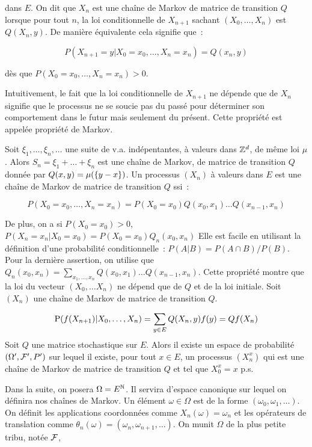 dans $E$. On dit que $X_n$ est une chaîne de Markov de matrice de transition $Q$ lorsque pour tout $n$, 
la loi conditionnelle de $X_{n+1}$ sachant $(X_0,\ldots,X_n)$ est $Q(X_n,y)$. De manière équivalente
cela signifie que~:\par
$$P(X_{n+1}=y|X_0=x_0,\ldots,X_n=x_n) = Q(x_n,y)$$\par
dès que $P(X_0=x_0,\ldots,X_n=x_n)>0$.\par
Intuitivement, le fait que la loi conditionnelle de $X_{n+1}$ ne dépende que de $X_n$ signifie que le 
processus ne se soucie pas du passé pour déterminer son comportement dans le futur mais seulement du présent.
Cette propriété est appelée propriété de Markov.\par
\rmq Soit $\xi_1,\ldots,\xi_n,\ldots$ une suite de v.a. indépentantes, à valeurs dans ${\mathbb{Z}}^d$, de même loi 
$\mu$. Alors $S_n = \xi_1 + \ldots + \xi_n$ est une chaîne de Markov, de matrice de transition $Q$ donnée par
$Q(x,y)=\mu(\{y-x\})$.
\proposition Un processus $(X_n)$ à valeurs dans $E$ est une chaîne de Markov de matrice de transition $Q$ ssi~:\par
$$P(X_0=x_0,\ldots, X_n=x_n) = P(X_0=x_0)Q(x_0,x_1)\ldots Q(x_{n-1},x_n)$$\par
De plus, on a si $P(X_0=x_0)> 0$, $P(X_n=x_n|X_0=x_0)=P(X_0=x_0)Q_n(x_0,x_n)$
\dem Elle est facile en utilisant la définition d'une probabilité conditionnelle~: $P(A|B) = P(A\cap B)/P(B)$.
Pour la dernière assertion, on utilise que $Q_n(x_0,x_n) = \sum_{x_1,\ldots,x_n}Q(x_0,x_1)\ldots 
Q(x_{n-1},x_n)$.
\rmq Cette propriété montre que la loi du vecteur $(X_0,\ldots X_n)$ ne dépend que de $Q$ et de la loi 
initiale.
\proposition Soit $(X_n)$ une chaîne de Markov de matrice de transition $Q$.\par
$$\textrm{P}(f(X_{n+1})|X_0,\ldots,X_n) = \sum_{y\in E} Q(X_n,y)f(y) = Qf(X_n)$$
 Soit $Q$ une matrice stochastique sur $E$. Alors il existe un espace de probabilité 
$(\Omega',\mathcal{F}',P')$ sur lequel il existe, pour tout $x\in E$, un processus $(X_n^x)$ qui est une chaîne de 
Markov de matrice de transition $Q$ et tel que $X_0^x=x$ p.s.\par
Dans la suite, on posera $\Omega = E^{\mathbb{N}}$. Il servira d'espace canonique sur lequel on définira nos chaînes
de Markov. Un élément $\omega\in \Omega$ est de la forme $(\omega_0,\omega_1,\ldots)$. On définit les 
applications coordonnées comme $X_n(\omega) = \omega_n$ et les opérateurs de translation comme
$\theta_n(\omega)=(\omega_n,\omega_{n+1},\ldots)$. On munit $\Omega$ de la plus petite tribu, notée $\mathcal{F}$, 
